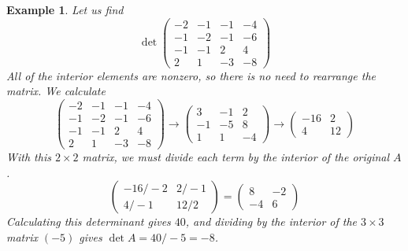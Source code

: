 \documentclass{article}
\newtheorem{example}{Example}[section]
\theoremstyle{remark}
\theoremstyle{definition}
\begin{document}
\begin{example}
Let us find
\[\det{\begin{pmatrix}
-2&-1&-1&-4\\-1&-2&-1&-6\\-1&-1&2&4\\2&1&-3&-8
\end{pmatrix}}\]
All of the interior elements are nonzero, so there is no need to rearrange the matrix. We calculate
\[\begin{pmatrix}
-2&-1&-1&-4\\-1&-2&-1&-6\\-1&-1&2&4\\2&1&-3&-8
\end{pmatrix} \rightarrow \begin{pmatrix}
3&-1&2\\-1&-5&8\\1&1&-4
\end{pmatrix} \rightarrow \begin{pmatrix}
-16&2\\4&12
\end{pmatrix}\]
With this $2 \times 2$ matrix, we must divide each term by the interior of the original $A$. 
\[\begin{pmatrix}
-16/-2 & 2/-1\\4/-1 & 12/2
\end{pmatrix} = \begin{pmatrix}
8&-2\\-4&6
\end{pmatrix}\]
Calculating this determinant gives $40$, and dividing by the interior of the $3 \times 3$ matrix $(-5)$ gives $\det{A} = 40/-5 = -8$. 
\end{example}
\end{document}
